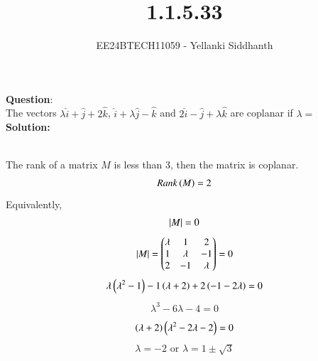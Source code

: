 \documentclass[journal]{IEEEtran}
\begin{document}

\vspace{3cm}

\title{1.1.5.33}
\author{EE24BTECH11059 - Yellanki Siddhanth
}
{\let\newpage\relax\maketitle}

\renewcommand{\thefigure}{\theenumi}
\renewcommand{\thetable}{\theenumi}
\setlength{\intextsep}{10pt} %


\renewcommand{\thetable}{\theenumi}


\textbf{Question}:\\

The vectors $\lambda\hat{i} + \hat{j} +2\hat{k}$, $\hat{i} + \lambda\hat{j} - \hat{k}$ and $2\hat{i} - \hat{j} +\lambda\hat{k}$  are coplanar if $\lambda = $
\\ \textbf{Solution: }\\
    \begin{table}[h!]    
      \centering
      
      \caption{}
    \end{table}\\
The rank of a matrix $M$ is less than 3, then the matrix is coplanar. 
    \begin{align}
        Rank\left(M\right) = 2\label{eq1.1.6.19.1}
    \end{align}
Equivalently,
    \begin{align}
        \left\vert M\right\vert = 0 \label{eq1.1.6.19.2}
    \end{align}
    \begin{align}
        \left\vert M\right\vert = \begin{pmatrix}\lambda & 1 & 2 \\ 1 & \lambda & -1 \\ 2 & -1 & \lambda\end{pmatrix} = 0 \label{eq1.1.6.19.3}
    \end{align}
    \begin{align}
        \lambda\left(\lambda^2 - 1\right) - 1\left(\lambda+2\right) + 2\left(-1-2\lambda\right) = 0  \label{eq1.1.6.19.4}
    \end{align}
    \begin{align}
        \lambda^3 - 6\lambda - 4 = 0  \label{eq1.1.6.19.5}
    \end{align}
    \begin{align}
        \left(\lambda + 2\right)\left(\lambda^2 - 2\lambda - 2\right) = 0  \label{eq1.1.6.19.6}
    \end{align}
    \begin{align}
         \lambda = -2 \text{ or } \lambda = 1 \pm \sqrt{3}\label{eq1.1.6.19.6}
    \end{align}
    
\end{document}

